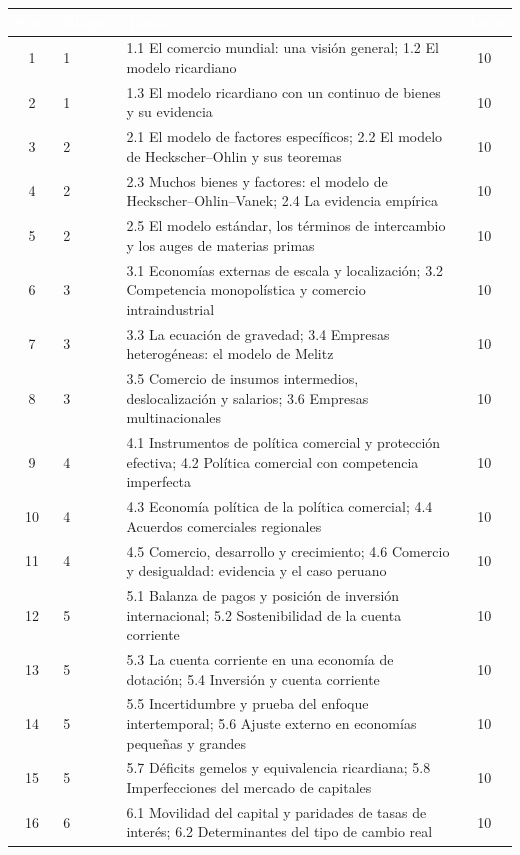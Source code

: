 \documentclass[11pt,a4paper]{article}
\renewcommand{\arraystretch}{1.3}
\newcommand{\cab}[1]{\textcolor{white}{\sffamily\bfseries #1}}
\newcommand{\filasalternas}{\rowcolors{2}{white}{tonoPalido}}
\begin{document}
{\small\filasalternas
\renewcommand{\arraystretch}{1.1}\noindent\begin{tabularx}{\textwidth}{clXc}
\toprule
\rowcolor{tonoOscuro}\cab{Sem.} & \cab{Bloque} & \cab{Temas} & \cab{Horas} \\
\midrule
1  & 1 & 1.1 El comercio mundial: una visión general; 1.2 El modelo ricardiano & 10 \\
2  & 1 & 1.3 El modelo ricardiano con un continuo de bienes y su evidencia & 10 \\
\midrule
3  & 2 & 2.1 El modelo de factores específicos; 2.2 El modelo de Heckscher--Ohlin y sus teoremas & 10 \\
4  & 2 & 2.3 Muchos bienes y factores: el modelo de Heckscher--Ohlin--Vanek; 2.4 La evidencia empírica & 10 \\
5  & 2 & 2.5 El modelo estándar, los términos de intercambio y los auges de materias primas & 10 \\
\midrule
6  & 3 & 3.1 Economías externas de escala y localización; 3.2 Competencia monopolística y comercio intraindustrial & 10 \\
7  & 3 & 3.3 La ecuación de gravedad; 3.4 Empresas heterogéneas: el modelo de Melitz & 10 \\
8  & 3 & 3.5 Comercio de insumos intermedios, deslocalización y salarios; 3.6 Empresas multinacionales & 10 \\
\midrule
9  & 4 & 4.1 Instrumentos de política comercial y protección efectiva; 4.2 Política comercial con competencia imperfecta & 10 \\
10 & 4 & 4.3 Economía política de la política comercial; 4.4 Acuerdos comerciales regionales & 10 \\
11 & 4 & 4.5 Comercio, desarrollo y crecimiento; 4.6 Comercio y desigualdad: evidencia y el caso peruano & 10 \\
\midrule
12 & 5 & 5.1 Balanza de pagos y posición de inversión internacional; 5.2 Sostenibilidad de la cuenta corriente & 10 \\
13 & 5 & 5.3 La cuenta corriente en una economía de dotación; 5.4 Inversión y cuenta corriente & 10 \\
14 & 5 & 5.5 Incertidumbre y prueba del enfoque intertemporal; 5.6 Ajuste externo en economías pequeñas y grandes & 10 \\
15 & 5 & 5.7 Déficits gemelos y equivalencia ricardiana; 5.8 Imperfecciones del mercado de capitales & 10 \\
\midrule
16 & 6 & 6.1 Movilidad del capital y paridades de tasas de interés; 6.2 Determinantes del tipo de cambio real & 10 \\

\end{tabularx}}
\end{document}
